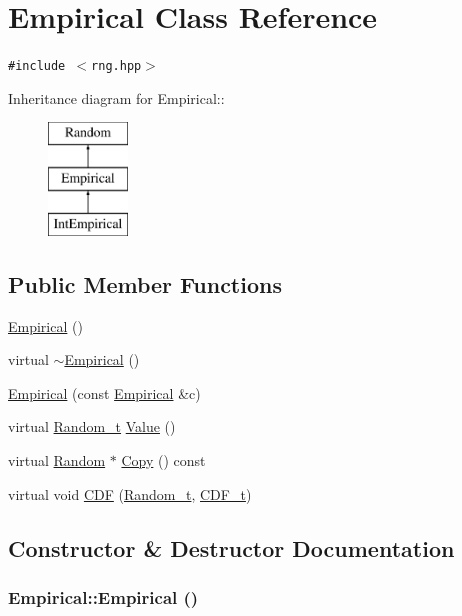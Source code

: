 \hypertarget{classEmpirical}{
\section{Empirical Class Reference}
\label{classEmpirical}
}
{\tt \#include $<$rng.hpp$>$}

Inheritance diagram for Empirical::\begin{figure}[H]
\begin{center}
\leavevmode
\includegraphics[height=3cm]{classEmpirical}
\end{center}
\end{figure}
\subsection*{Public Member Functions}
\begin{CompactItemize}
\item 
\hyperlink{classEmpirical_f2a9c05d8bac2f4698cb8f858b3a1724}{Empirical} ()
\item 
virtual \hyperlink{classEmpirical_d9422bac95c25865158cade0982516e4}{$\sim$Empirical} ()
\item 
\hyperlink{classEmpirical_c8e3a99d92dae74fe99ca47829821734}{Empirical} (const \hyperlink{classEmpirical}{Empirical} \&c)
\item 
virtual \hyperlink{rng_8hpp_ad41e7f5d86b1109b6a6a032c86cdd3f}{Random\_\-t} \hyperlink{classEmpirical_76b4c62b6fdcfbe2dbaff2462e4153ad}{Value} ()
\item 
virtual \hyperlink{classRandom}{Random} $\ast$ \hyperlink{classEmpirical_d5429fdf863d53d74649cc8c630cfb0b}{Copy} () const 
\item 
virtual void \hyperlink{classEmpirical_edc41dd73a4398ac77d537c78b9558de}{CDF} (\hyperlink{rng_8hpp_ad41e7f5d86b1109b6a6a032c86cdd3f}{Random\_\-t}, \hyperlink{rng_8hpp_68ff29d325e1cb493f27ede4fa99c8e4}{CDF\_\-t})
\end{CompactItemize}


\subsection{Constructor \& Destructor Documentation}
\hypertarget{classEmpirical_f2a9c05d8bac2f4698cb8f858b3a1724}{
\subsubsection[{Empirical}]{\setlength{\rightskip}{0pt plus 5cm}Empirical::Empirical ()}}
\label{classEmpirical_f2a9c05d8bac2f4698cb8f858b3a1724}


